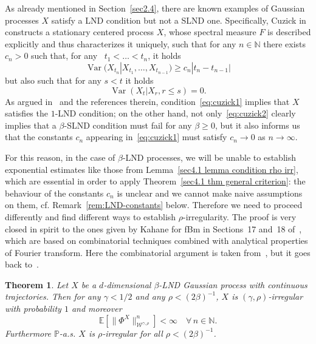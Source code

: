 \documentclass[10pt]{article}
\newcommand{\tmop}[1]{\ensuremath{\operatorname{#1}}}
\newtheorem{theorem}{Theorem}%
\begin{document}
As already mentioned in Section~\ref{sec2.4}, there are known examples of
Gaussian processes $X$ satisfy a LND condition but not a SLND one.
Specifically, Cuzick in~{\cite[Section 3]{cuzick1977}} constructs a stationary centered
process $X$, whose spectral measure $F$ is described explicitly and thus
characterizes it uniquely, such that for any $n \in \mathbb{N}$ there exists
$c_n > 0$ such that, for any \ $t_1 < \ldots < t_n$, it holds
\begin{equation}
	\tmop{Var} (X_{t_n} |X_{t_1}, \ldots, X_{t_{n - 1}}) \geqslant c_n  | t_n -
   t_{n - 1} | \label{eq:cuzick1}
\end{equation}
but also such that for any $s < t$ it holds
\begin{equation}
	\tmop{Var} (X_t |X_r, r \leqslant s) = 0. \label{eq:cuzick2}
\end{equation}
As argued in~{\cite{cuzick1977}} and the references therein, condition~\eqref{eq:cuzick1} implies that
$X$ satisfies the $1$-LND condition; on the other hand, not
only~\eqref{eq:cuzick2} clearly implies that a $\beta$-SLND condition must
fail for any $\beta \geqslant 0$, but it also informs us that the constants
$c_n$ appearing in~\eqref{eq:cuzick1} must satisfy $c_n \rightarrow 0$ as $n
\rightarrow \infty$.

For this reason, in the case of $\beta$-LND processes, we will be unable to
establish exponential estimates like those from Lemma~\ref{sec4.1 lemma
condition rho irr}, which are essential in order to apply Theorem~\ref{sec4.1
thm general criterion}: the behaviour of the constants $c_n$ is unclear and we
cannot make naive assumptions on them, cf. Remark~\ref{rem:LND-constants}
below. Therefore we need to proceed differently and find different ways to
establish $\rho$\mbox{-}irregularity. The proof is very closed in spirit to
the ones given by Kahane for fBm in Sections~17 and~18 of~{\cite{kahane}},
which are based on combinatorial techniques combined with analytical
properties of Fourier transform. Here the combinatorial argument is taken
from~{\cite{catelliergubinellipreliminary}}, but it goes back
to~{\cite{nualart2003}}.

\begin{theorem}
  \label{sec4.4 main thm}Let $X$ be a $d$\mbox{-}dimensional $\beta$\mbox{-}LND
  Gaussian process with continuous trajectories. Then for any $\gamma < 1 / 2$
  and any $\rho < (2 \beta)^{- 1}$, $X$ is $(\gamma, \rho)$\mbox{-}irregular
  with probability $1$ and moreover
  \[ \mathbb{E} [\| \Phi^X \|_{\mathcal{W}^{\gamma, \rho}}^n] < \infty \quad
     \forall \, n \in \mathbb{N}. \]
  Furthermore $\mathbb{P}$\mbox{-}a.s. $X$ is $\rho$\mbox{-}irregular for all
  $\rho < (2 \beta)^{- 1}$.
\end{theorem}
\end{document}
